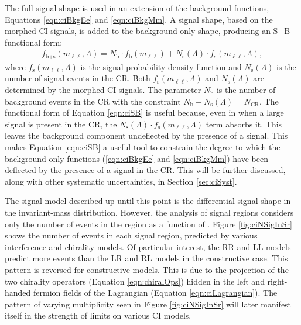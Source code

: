 The full signal shape is used in an extension of the background functions, Equations \ref{eqn:ciBkgEe} and \ref{eqn:ciBkgMm}.
A signal shape, based on the morphed CI signals, is added to the background-only shape, producing an S+B functional form:
\begin{align}
\label{eqn:ciSB}
f_\textrm{b+s}(m_{\ell\ell},\Lambda) = N_\textrm{b}\cdot f_\textrm{b}(m_{\ell\ell}) + N_\textrm{s}(\Lambda)\cdot f_\textrm{s}(m_{\ell\ell},\Lambda),
\end{align}
where $f_\textrm{s}(m_{\ell\ell},\Lambda)$ is the signal probability density function and $N_\textrm{s}(\Lambda)$ is the number of signal events in the CR.
Both $f_\textrm{s}(m_{\ell\ell},\Lambda)$ and $N_\textrm{s}(\Lambda)$ are determined by the morphed CI signals.
The parameter $N_\textrm{b}$ is the number of background events in the CR with the constraint $N_\textrm{b}+N_\textrm{s}(\Lambda)=N_\textrm{CR}$.
The functional form of Equation \ref{eqn:ciSB} is useful because, even in when a large signal is present in the CR, the $N_\textrm{s}(\Lambda)\cdot f_\textrm{s}(m_{\ell\ell},\Lambda)$ term absorbs it.
This leaves the background component undeflected by the presence of a signal.
This makes Equation \ref{eqn:ciSB} a useful tool to constrain the degree to which the background-only functions (\ref{eqn:ciBkgEe} and \ref{eqn:ciBkgMm}) have been deflected by the presence of a signal in the CR.
This will be further discussed, along with other systematic uncertainties, in Section \ref{sec:ciSyst}.

The signal model described up until this point is the differential signal shape in the invariant-mass distribution.
However, the analysis of signal regions considers only the number of events in the region as a function of \lam.
Figure \ref{fig:ciNSigInSr} shows the number of events in each signal region, predicted by various interference and chirality models.
Of particular interest, the RR and LL models predict more events than the LR and RL models in the constructive case.
This pattern is reversed for constructive models.
This is due to the projection of the two chirality operators (Equation \ref{eqn:chiralOps}) hidden in the left and right-handed fermion fields of the Lagrangian (Equation \ref{eqn:ciLagrangian}).
The pattern of varying multiplicity seen in Figure \ref{fig:ciNSigInSr} will later manifest itself in the strength of limits on various CI models.

